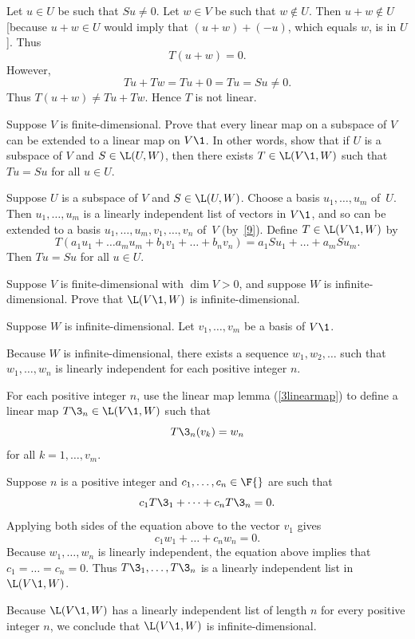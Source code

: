 \begin{Solution}
Let $u \in U$ be such that $Su \ne 0$. Let $w \in V$ be such that $w \notin U$.  Then $u + w \notin U$ [because $u + w \in U$ would imply that $(u + w) + (-u)$, which equals $w$, is in $U$]. Thus
\[
T(u + w) = 0.
\]
However,
\[
Tu + Tw = Tu + 0 = Tu = Su \ne 0.
\]
Thus $T(u + w) \ne Tu + Tw$. Hence $T$ is not linear.
\end{Solution}

\exercise
Suppose $V$ is finite-dimensional.  Prove that every linear map on a
subspace of $V$ can be extended to a linear map on $V\1$.  In other words, show
that if $U$ is a subspace of $V$ and $S \in \L(U, W)$, then there exists
$T \in \L(V\1, W)$ such that $Tu = Su$ for all $u \in U$.\label{384}

\begin{Solution}
Suppose $U$ is a subspace of $V$ and $S \in \L(U, W)$.  Choose a basis
$u_1, \dots, u_m$ of~$U$.  Then $u_1, \dots, u_m$ is a linearly
independent list of vectors in $V\1$, and so can be extended to a basis
$u_1, \dots, u_m, v_1, \dots, v_n$ of~$V$ (by~\ref{9}).  Define $T \in \L(V\1, W)$
by
\[
T(a_1 u_1 + \dots a_m u_m + b_1 v_1 + \dots + b_n v_n) =
a_1 Su_1 + \dots + a_m Su_m.
\]
Then $Tu = Su$ for all $u \in U$.
\end{Solution}

\exercise
Suppose $V$ is finite-dimensional with $\dim V > 0$, and suppose $W$ is infinite-dimensional. Prove that $\L(V\1,W)$ is infinite-dimensional.

\begin{Solution}
Suppose $W$ is infinite-dimensional. Let $v_1, \dots, v_m$ be a basis of $V\1$.

Because $W$ is infinite-dimensional, there exists a sequence $w_1, w_2, \dots$ such that $w_1, \dots, w_n$ is linearly independent for each positive integer $n$.

For each positive integer $n$, use the linear map lemma (\ref{3linearmap}) to define a linear map $T\3_n \in \L(V\1, W)$ such that
\[
T\3_n(v_k) = w_n
\]
for all $k = 1, \dots, v_m$.

Suppose $n$ is a positive integer and $c_1, \dots, c_n \in \F{}$ are such that
\[
c_1 T\3_1 + \dots + c_n T\3_n = 0.
\]
Applying both sides of the equation above to the vector $v_1$ gives
\[
c_1 w_1 + \dots + c_n w_n = 0.
\]
Because $w_1, \dots, w_n$ is linearly independent, the equation above implies that $c_1 = \dots = c_n = 0$. Thus
$T\3_1, \dots, T\3_n$ is a linearly independent list in $\L(V\1,W)$.

Because $\L(V\1,W)$ has a linearly independent list of length $n$ for every positive integer $n$, we conclude that $\L(V\1,W)$ is infinite-dimensional.
\end{Solution}

